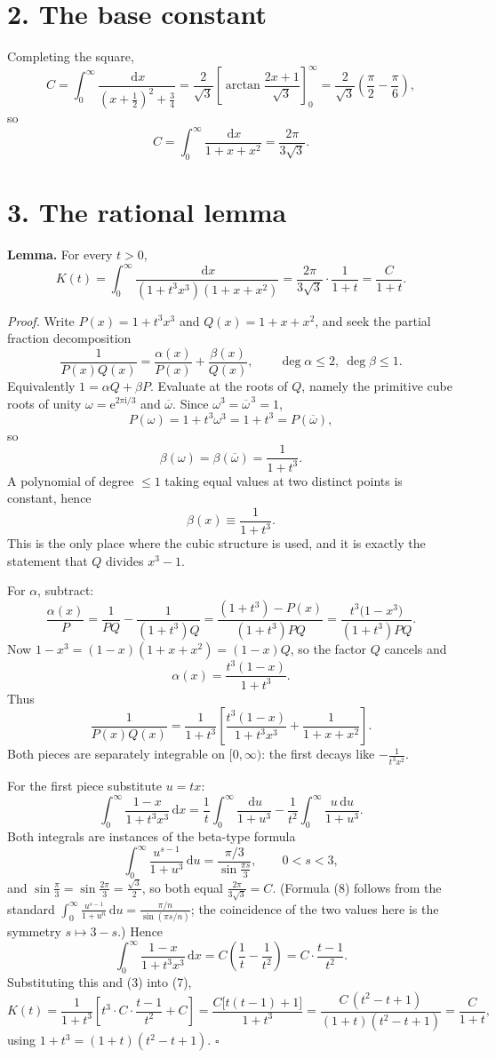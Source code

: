 \documentclass[12pt]{article}
\newcommand{\dd}{\,\mathrm{d}}
\newcommand{\ii}{\mathrm{i}}
\newcommand{\e}{\mathrm{e}}
\newcommand{\om}{\omega}
\begin{document}
\section*{2. The base constant}

Completing the square,
\[
C=\int_0^\infty\frac{\dd x}{\left(x+\frac12\right)^2+\frac34}
=\frac{2}{\sqrt3}\left[\arctan\frac{2x+1}{\sqrt3}\right]_0^\infty
=\frac{2}{\sqrt3}\left(\frac\pi2-\frac\pi6\right),
\]
so
\[
\boxed{\displaystyle C=\int_0^\infty\frac{\dd x}{1+x+x^2}
=\frac{2\pi}{3\sqrt3}.}
\tag{3}
\]

\section*{3. The rational lemma}

\textbf{Lemma.} For every \(t>0\),
\[
\boxed{\displaystyle
K(t)=\int_0^\infty\frac{\dd x}{(1+t^3x^3)(1+x+x^2)}
=\frac{2\pi}{3\sqrt3}\cdot\frac1{1+t}
=\frac{C}{1+t}.}
\tag{4}
\]

\textit{Proof.} Write \(P(x)=1+t^3x^3\) and \(Q(x)=1+x+x^2\), and seek the
partial fraction decomposition
\[
\frac1{P(x)Q(x)}=\frac{\alpha(x)}{P(x)}+\frac{\beta(x)}{Q(x)},
\qquad \deg\alpha\le2,\ \deg\beta\le1 .
\]
Equivalently \(1=\alpha Q+\beta P\). Evaluate at the roots of \(Q\),
namely the primitive cube roots of unity \(\om=\e^{2\pi\ii/3}\) and
\(\overline\om\). Since \(\om^3=\overline\om^{\,3}=1\),
\[
P(\om)=1+t^3\om^3=1+t^3=P(\overline\om),
\]
so
\[
\beta(\om)=\beta(\overline\om)=\frac1{1+t^3}.
\]
A polynomial of degree \(\le1\) taking equal values at two distinct
points is constant, hence
\[
\beta(x)\equiv\frac1{1+t^3}.
\tag{5}
\]
This is the only place where the cubic structure is used, and it is
exactly the statement that \(Q\) divides \(x^3-1\).

For \(\alpha\), subtract:
\[
\frac{\alpha(x)}{P}
=\frac1{PQ}-\frac1{(1+t^3)Q}
=\frac{(1+t^3)-P(x)}{(1+t^3)PQ}
=\frac{t^3\bigl(1-x^3\bigr)}{(1+t^3)PQ}.
\]
Now \(1-x^3=(1-x)(1+x+x^2)=(1-x)Q\), so the factor \(Q\) cancels and
\[
\alpha(x)=\frac{t^3(1-x)}{1+t^3}.
\tag{6}
\]
Thus
\[
\frac1{P(x)Q(x)}
=\frac1{1+t^3}\left[\frac{t^3(1-x)}{1+t^3x^3}+\frac1{1+x+x^2}\right].
\tag{7}
\]
Both pieces are separately integrable on \([0,\infty)\): the first decays
like \(-\frac1{t^3x^2}\).

For the first piece substitute \(u=tx\):
\[
\int_0^\infty\frac{1-x}{1+t^3x^3}\dd x
=\frac1t\int_0^\infty\frac{\dd u}{1+u^3}
-\frac1{t^2}\int_0^\infty\frac{u\dd u}{1+u^3}.
\]
Both integrals are instances of the beta-type formula
\[
\int_0^\infty\frac{u^{s-1}}{1+u^3}\dd u=\frac{\pi/3}{\sin\frac{\pi s}{3}},
\qquad 0<s<3,
\tag{8}
\]
and \(\sin\frac\pi3=\sin\frac{2\pi}3=\frac{\sqrt3}{2}\), so both equal
\(\frac{2\pi}{3\sqrt3}=C\). (Formula (8) follows from the standard
\(\int_0^\infty\frac{u^{s-1}}{1+u^n}\dd u=\frac{\pi/n}{\sin(\pi s/n)}\);
the coincidence of the two values here is the symmetry \(s\mapsto3-s\).)
Hence
\[
\int_0^\infty\frac{1-x}{1+t^3x^3}\dd x
=C\left(\frac1t-\frac1{t^2}\right)
=C\cdot\frac{t-1}{t^2}.
\]
Substituting this and (3) into (7),
\[
K(t)=\frac{1}{1+t^3}\left[t^3\cdot C\cdot\frac{t-1}{t^2}+C\right]
=\frac{C\bigl[t(t-1)+1\bigr]}{1+t^3}
=\frac{C\,(t^2-t+1)}{(1+t)(t^2-t+1)}
=\frac{C}{1+t},
\]
using \(1+t^3=(1+t)(t^2-t+1)\). \(\square\)
\end{document}
